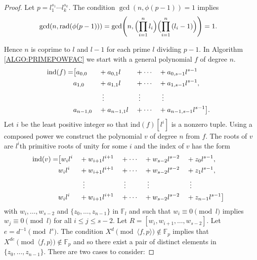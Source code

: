 \documentclass{article}
\let\originalleft\left
\let\originalright\right
\renewcommand{\left}{\mathopen{}\mathclose\bgroup\originalleft}
\renewcommand{\right}{\aftergroup\egroup\originalright}
\theoremstyle{plain}
\theoremstyle{definition}
\def\Fp {{ \mathbb{F} _ {p} }}
\def\ind {{ \mathrm{ind} }}
\def\rad {{ \mathrm{rad}}}
\begin{document}
		\begin{proof}
		    Let $p=l_1^{s_1}\cdots l_k^{s_k}$. The condition $\gcd(n,\phi(p-1))=1$ implies 
				\[ \gcd(n,\rad(\phi(p-1)))=\gcd \left(n, \Bigl( \prod_{i=1}^n{l_i} \Bigr) \Bigl( \prod_{i=1}^n{(l_i-1 )} \Bigr) \right)=1.\] 

			  Hence $n$ is coprime to $l$ and $l-1$ for each prime $l$ dividing $p-1$. In Algorithm \ref{ALGO:PRIMEPOWFAC} we start with a general polynomial $f$ of degree $n$. 
		    \begin{alignat*}{5}                                               
        \ind(f) =       & \bigl[ a_{0,0}   &&+ a_{0,1}l        && +               \cdots &&+  a_{0,s-1}l^{s-1}         \\
                        &        a_{1,0}   &&+ a_{1,1}l        && +               \cdots &&+  a_{1,s-1}l^{s-1} ,       \\
                        &                  &&\vdotswithin{+}   && \vdotswithin{+}        &&\vdotswithin{+}             \\
                        &        a_{n-1,0} &&+ a_{n-1,1}l      && +               \cdots &&+  a_{n-1,s-1}l^{s-1} \bigr].
	    	\end{alignat*}	
		    Let $i$ be the least positive integer so that $\ind(f)[l^i]$ is a nonzero tuple. Using a composed power we construct the polynomial $v$ of degree $n$ from $f$. The roots of $v$ are $l^i$th primitive roots of unity for some $i$ and the index of $v$ has the form		
		    \begin{alignat*}{5}
		    \ind(v) =        & \bigl[ w_{i}l^{i} &&+ w_{i+1}l^{i+1} &&+ \cdots          &&+  w_{s-2}l^{s-2} &&+ z_0l^{s-1} ,  \\
                         & w_{i}l^{i}        &&+ w_{i+1}l^{i+1} &&+ \cdots          &&+  w_{s-2}l^{s-2} &&+ z_1l^{s-1} ,  \\
                         &                   &&\vdotswithin{+}  &&\vdotswithin{+}   &&\vdotswithin{+}   &&\vdotswithin{+} \\
                         & w_{i}l^{i}        &&+ w_{i+1}l^{i+1} &&+ \cdots          &&+  w_{s-2}l^{s-2} &&+ z_{n-1}l^{s-1} \bigr]
		    \end{alignat*}
        \noindent with $w_i,\ldots,w_{s-2}$ and $\{z_0,\ldots,z_{n-1}\}$ in $\mathbb{F}_l$ and such that $w_i \equiv 0 \pmod l$ implies $w_j \equiv 0 \pmod l$ for all $i \leq j \leq s-2$. Let $R=[w_{i},w_{i+1},\ldots,w_{s-2}]$. Let $e=d^{-1} \pmod {l^s}$. The condition $X^d \pmod{\langle f,p \rangle} \not\in \Fp$ implies that $X^{de} \pmod{\langle f,p \rangle} \not\in \Fp$ and so there exist a pair of distinct elements in $\{z_0,\ldots,z_{n-1} \}$. There are two cases to consider:

\end{proof}
\end{document}
